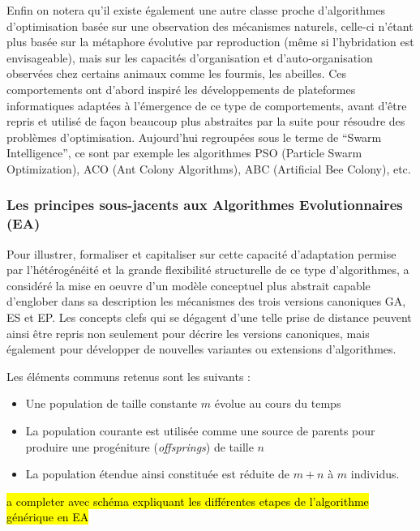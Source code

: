 Enfin on notera qu'il existe également une autre classe proche d'algorithmes d'optimisation basée sur une observation des mécanismes naturels, celle-ci n'étant plus basée sur la métaphore évolutive par reproduction (même si l'hybridation est envisageable), mais sur les capacités d'organisation et d'auto-organisation observées chez certains animaux comme les fourmis, les abeilles. Ces comportements ont d'abord inspiré les développements de plateformes informatiques adaptées à l'émergence de ce type de comportements, avant d'être repris et utilisé de façon beaucoup plus abstraites par la suite pour résoudre des problèmes d'optimisation. Aujourd'hui regroupées sous le terme de \foreignquote{english}{Swarm Intelligence}, ce sont par exemple les algorithmes PSO (Particle Swarm Optimization), ACO (Ant Colony Algorithms), ABC (Artificial Bee Colony), etc.

\subsubsection{Les principes sous-jacents aux Algorithmes Evolutionnaires (EA)}
\label{ssec:principesEA}

Pour illustrer, formaliser et capitaliser sur cette capacité d'adaptation  permise par l'hétérogénéité et la grande flexibilité structurelle de ce type d'algorithmes, \textcite[49]{DeJong2006a} a considéré la mise en oeuvre d'un modèle conceptuel plus abstrait capable d'englober dans sa description les mécanismes des trois versions canoniques GA, ES et EP. Les concepts clefs qui se dégagent d'une telle prise de distance peuvent ainsi être repris non seulement pour décrire les versions canoniques, mais également pour développer de nouvelles variantes ou extensions d'algorithmes.

Les éléments communs retenus sont les suivants :

\begin{itemize}
\item Une population de taille constante $m$ évolue au cours du temps
\item La population courante est utilisée comme une source de parents pour produire une progéniture (\textit{offsprings}) de taille $n$
\item La population étendue ainsi constituée est réduite de $m + n$ à $m$ individus.
\end{itemize}

\hl{a completer avec schéma expliquant les différentes etapes de l'algorithme générique en EA}

